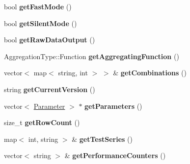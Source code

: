 \begin{DoxyCompactItemize}
\item 
\hypertarget{classAbstractBenchmark_a1e3280102a3a981f7bff2d049e5e55fa}{bool {\bfseries get\-Fast\-Mode} ()}\label{classAbstractBenchmark_a1e3280102a3a981f7bff2d049e5e55fa}

\item 
\hypertarget{classAbstractBenchmark_aebe107874e21832dc1beb0c0fd98b882}{bool {\bfseries get\-Silent\-Mode} ()}\label{classAbstractBenchmark_aebe107874e21832dc1beb0c0fd98b882}

\item 
\hypertarget{classAbstractBenchmark_a084951f9c664e1df7c6444471ec667ac}{bool {\bfseries get\-Raw\-Data\-Output} ()}\label{classAbstractBenchmark_a084951f9c664e1df7c6444471ec667ac}

\item 
\hypertarget{classAbstractBenchmark_afa26c9a27ee2911a9b5b8c6e0c24160b}{Aggregation\-Type\-::\-Function {\bfseries get\-Aggregating\-Function} ()}\label{classAbstractBenchmark_afa26c9a27ee2911a9b5b8c6e0c24160b}

\item 
\hypertarget{classAbstractBenchmark_a6bb2202aed48bc3317da622e071a5adb}{vector$<$ map$<$ string, int $>$ $>$ \& {\bfseries get\-Combinations} ()}\label{classAbstractBenchmark_a6bb2202aed48bc3317da622e071a5adb}

\item 
\hypertarget{classAbstractBenchmark_aee6c07c4cb2e419de6557bf4da8fa396}{string {\bfseries get\-Current\-Version} ()}\label{classAbstractBenchmark_aee6c07c4cb2e419de6557bf4da8fa396}

\item 
\hypertarget{classAbstractBenchmark_af6859f16e6aff3609c979c9c42def79b}{vector$<$ \hyperlink{classParameter}{Parameter} $>$ $\ast$ {\bfseries get\-Parameters} ()}\label{classAbstractBenchmark_af6859f16e6aff3609c979c9c42def79b}

\item 
\hypertarget{classAbstractBenchmark_a90394a5f73b8d92e99f1ab26bd82add3}{size\-\_\-t {\bfseries get\-Row\-Count} ()}\label{classAbstractBenchmark_a90394a5f73b8d92e99f1ab26bd82add3}

\item 
\hypertarget{classAbstractBenchmark_a639220c4d3c8662f2d2db51b28e836d0}{map$<$ int, string $>$ \& {\bfseries get\-Test\-Series} ()}\label{classAbstractBenchmark_a639220c4d3c8662f2d2db51b28e836d0}

\item 
\hypertarget{classAbstractBenchmark_aea25f908ec53bfdc699497176cb0da3b}{vector$<$ string $>$ \& {\bfseries get\-Performance\-Counters} ()}\label{classAbstractBenchmark_aea25f908ec53bfdc699497176cb0da3b}


\end{DoxyCompactItemize}
